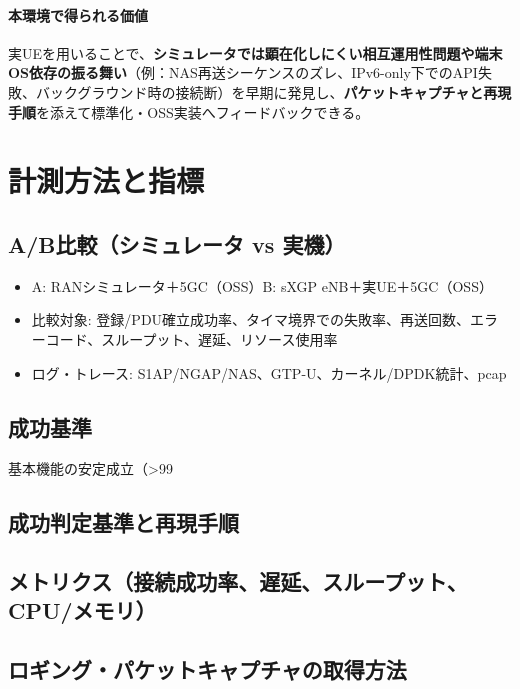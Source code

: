 \paragraph{本環境で得られる価値}
実UEを用いることで、\textbf{シミュレータでは顕在化しにくい相互運用性問題や端末OS依存の振る舞い}（例：NAS再送シーケンスのズレ、IPv6-only下でのAPI失敗、バックグラウンド時の接続断）を早期に発見し、\textbf{パケットキャプチャと再現手順}を添えて標準化・OSS実装へフィードバックできる。

\section{計測方法と指標}
\subsection{A/B比較（シミュレータ vs 実機）}
\begin{itemize}
	\item A: RANシミュレータ＋5GC（OSS）\quad B: sXGP eNB＋実UE＋5GC（OSS）
	\item 比較対象: 登録/PDU確立成功率、タイマ境界での失敗率、再送回数、エラーコード、スループット、遅延、リソース使用率
	\item ログ・トレース: S1AP/NGAP/NAS、GTP-U、カーネル/DPDK統計、pcap
\end{itemize}
\subsection{成功基準}
基本機能の安定成立（>99%
\subsection{成功判定基準と再現手順}
\subsection{メトリクス（接続成功率、遅延、スループット、CPU/メモリ）}
\subsection{ロギング・パケットキャプチャの取得方法}
